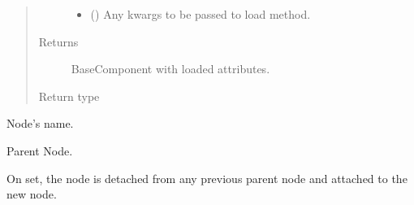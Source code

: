 \documentclass[letterpaper,10pt,english]{sphinxmanual}
\begin{document}
\begin{fulllineitems}
\begin{fulllineitems}
\begin{quote}
\begin{description}
\begin{itemize}
\item {} 
 (\sphinxstyleliteralemphasis{\sphinxupquote{, }}) \textendash{} Any kwargs to be passed to load method.

\end{itemize}

\item[{Returns}] \leavevmode
{} \textendash{} BaseComponent with loaded attributes.

\item[{Return type}] \leavevmode
{\hyperref[\detokenize{api/base_classes:geology.src.base_component.BaseComponent}]{}}

\end{description}\end{quote}

\end{fulllineitems}


\begin{fulllineitems}
Node’s name.

\end{fulllineitems}


\begin{fulllineitems}
\label{\detokenize{api/wells:geology.src.wells.WellSegment.parent}}
Parent Node.

On set, the node is detached from any previous parent node and attached
to the new node.


\end{fulllineitems}
\end{fulllineitems}
\end{document}
